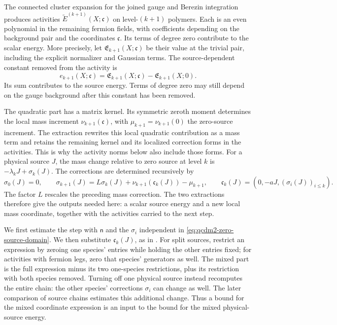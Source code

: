 \documentclass[11pt,letterpaper,reqno]{amsart}
\theoremstyle{definition}
\theoremstyle{remark}
\begin{document}
The connected cluster expansion for the joined gauge and
Berezin integration produces activities
$\widetilde E^{(k+1)}(X;\mathfrak c)$ on level-$(k+1)$
polymers. Each is an even polynomial in the remaining
fermion fields, with coefficients depending on the
background pair and the coordinates $\mathfrak c$.
Its terms of degree zero contribute to the scalar energy.
More precisely, let $\mathfrak E_{k+1}(X;\mathfrak c)$
be their value at the trivial pair, including the explicit
normalizer and Gaussian terms. The source-dependent
constant removed from the activity is
\[
 e_{k+1}(X;\mathfrak c)
 =\mathfrak E_{k+1}(X;\mathfrak c)
                    -\mathfrak E_{k+1}(X;0).
\]
Its sum contributes to the source energy. Terms of degree
zero may still depend on the gauge background after this
constant has been removed.

The quadratic part has a matrix kernel. Its symmetric
zeroth moment determines the local mass increment
$\nu_{k+1}(\mathfrak c)$, with
$\mu_{k+1}=\nu_{k+1}(0)$ the zero-source increment.
The extraction rewrites this local quadratic contribution
as a mass term and retains the remaining kernel and its
localized correction forms in the activities. This is
why the activity norms below also include those forms.
For a physical source $J$, the mass change relative to
zero source at level $k$ is $-\lambda_kJ+\sigma_k(J)$.
The corrections are determined recursively by
\[
 \sigma_0(J)=0,\qquad
 \sigma_{k+1}(J)=L\sigma_k(J)
      +\nu_{k+1}(\mathfrak c_k(J))-\mu_{k+1},\qquad
 \mathfrak c_k(J)=(0,-aJ,(\sigma_i(J))_{i\le k}).
\]
The factor $L$ rescales the preceding mass correction.
The two extractions therefore give the outputs needed
here: a scalar source energy and a new local mass
coordinate, together with the activities carried to
the next step.

We first estimate the step with $\mathsf n$ and the
$\sigma_i$ independent in
\eqref{eq:qcdm2-zero-source-domain}. We then substitute
$\mathfrak c_k(J)$, as in \cite[Lem. 10.4]{QCDM1}.
For split sources, restrict an expression by zeroing
one species' entries while holding the other entries
fixed; for activities with fermion legs, zero that
species' generators as well. The mixed part is the
full expression minus its two one-species restrictions,
plus its restriction with both species removed.
Turning off one
physical source instead recomputes the entire chain:
the other species' corrections $\sigma_i$ can change
as well. The later comparison of source chains estimates
this additional change. Thus a bound for the mixed
coordinate expression is an input to the bound for
the mixed physical-source energy.
\end{document}
